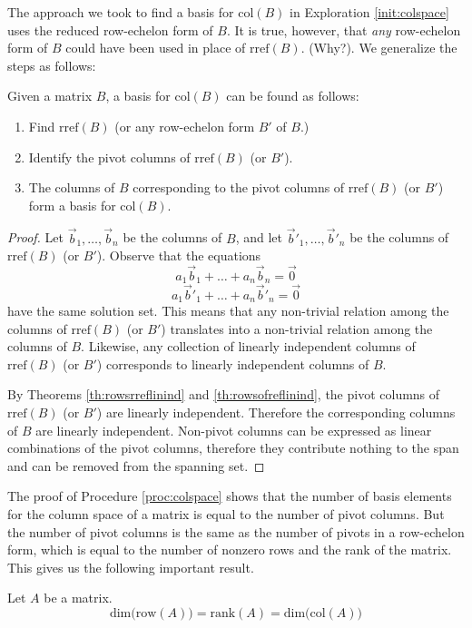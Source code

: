 \documentclass{ximera}
\begin{document}
The approach we took to find a basis for $\mbox{col}(B)$ in Exploration \ref{init:colspace} uses the reduced row-echelon form of $B$. It is true, however, that {\it any} row-echelon form of $B$ could have been used in place of $\mbox{rref}(B)$.  (Why?). We generalize the steps as follows:
\begin{procedure}\label{proc:colspace}
Given a matrix $B$, a basis for $\mbox{col}(B)$ can be found as follows:
\begin{enumerate}
\item Find $\mbox{rref}(B)$ (or any row-echelon form $B'$ of $B$.)
\item Identify the pivot columns of $\mbox{rref}(B)$ (or $B'$).
\item The columns of $B$ corresponding to the pivot columns of $\mbox{rref}(B)$ (or $B'$) form a basis for $\mbox{col}(B)$.
\end{enumerate}
\end{procedure}
\begin{proof}  Let $\vec{b}_1,\ldots ,\vec{b}_n$ be the columns of $B$, and let $\vec{b}'_1,\ldots ,\vec{b}'_n$ be the columns of $\mbox{rref}(B)$ (or $B'$).
Observe that the equations
\begin{equation}a_1\vec{b}_1+\ldots +a_n\vec{b}_n=\vec{0}\end{equation}
\begin{equation}a_1\vec{b}'_1+\ldots +a_n\vec{b}'_n=\vec{0}\end{equation}
have the same solution set.  This means that any non-trivial relation among the columns of $\mbox{rref}(B)$ (or $B'$) translates into a non-trivial relation among the columns of $B$.  Likewise, any collection of linearly independent columns of $\mbox{rref}(B)$ (or $B'$) corresponds to linearly independent columns of $B$.

By Theorems \ref{th:rowsrreflinind} and \ref{th:rowsofreflinind}, the pivot columns of $\mbox{rref}(B)$ (or $B'$) are linearly independent.  Therefore the corresponding columns of $B$ are linearly independent.  Non-pivot columns can be expressed as linear combinations of the pivot columns, therefore they contribute nothing to the span and can be removed from the spanning set. 
\end{proof}
The proof of Procedure \ref{proc:colspace} shows that the number of basis elements for the column space of a matrix is equal to the number of pivot columns.  But the number of pivot columns is the same as the number of pivots in a row-echelon form, which is equal to the number of nonzero rows and the rank of the matrix.  This gives us the following important result.
\begin{theorem}\label{th:dimroweqdimcoleqrank}
Let $A$ be a matrix.
$$\mbox{dim}\Big(\mbox{row}(A)\Big)=\mbox{rank}(A)=\mbox{dim}\Big(\mbox{col}(A)\Big)$$
\end{theorem}
\end{document}
